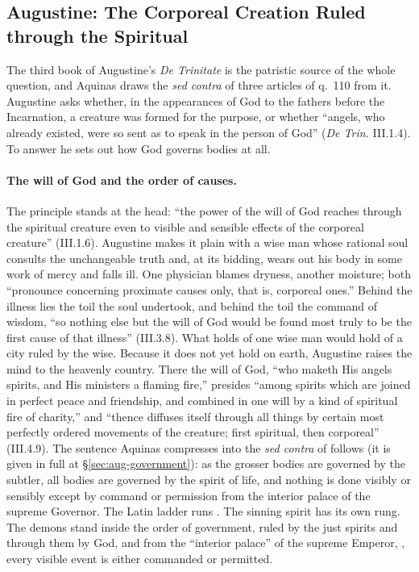 \sectionguard
\subsection{Augustine: The Corporeal Creation Ruled through the Spiritual}

The third book of Augustine's \emph{De Trinitate} is the patristic source
of the whole question, and Aquinas draws the \emph{sed contra} of three
articles of q.~110 from it. Augustine asks whether, in the appearances of
God to the fathers before the Incarnation, a creature was formed for the
purpose, or whether ``angels, who already existed, were so sent as to speak
in the person of God'' (\emph{De Trin.} III.1.4). To answer he sets out how
God governs bodies at all.

\paragraph{The will of God and the order of causes.} The principle stands
at the head: ``the power of the will of God reaches through the spiritual
creature even to visible and sensible effects of the corporeal creature''
(III.1.6). Augustine makes it plain with a wise man whose rational soul
consults the unchangeable truth and, at its bidding, wears out his body in
some work of mercy and falls ill. One physician blames dryness, another
moisture; both ``pronounce concerning proximate causes only, that is,
corporeal ones.'' Behind the illness lies the toil the soul undertook, and
behind the toil the command of wisdom, ``so nothing else but the will of
God would be found most truly to be the first cause of that illness''
(III.3.8). What holds of one wise man would hold of a city ruled by the
wise. Because it does not yet hold on earth, Augustine raises the mind to
the heavenly country. There the will of God, ``who maketh His angels
spirits, and His ministers a flaming fire,'' presides ``among spirits which
are joined in perfect peace and friendship, and combined in one will by a
kind of spiritual fire of charity,'' and ``thence diffuses itself through
all things by certain most perfectly ordered movements of the creature;
first spiritual, then corporeal'' (III.4.9). The sentence Aquinas
compresses into the \emph{sed contra} of  follows (it is
given in full at \S\ref{sec:aug-government}): as the grosser bodies are
governed by the subtler, all bodies are governed by the spirit of life, and
nothing is done visibly or sensibly except by command or permission from
the interior palace of the supreme Governor. The Latin ladder runs . The sinning spirit has its own rung. The demons stand inside the
order of government, ruled by the just spirits and through them by God,
and from the ``interior palace'' of the supreme Emperor, , every
visible event is either commanded or permitted.

